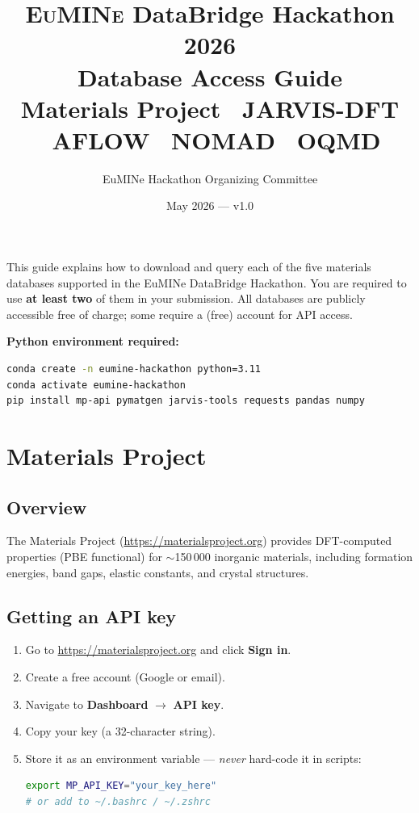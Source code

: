 \documentclass[11pt,a4paper]{article}
\title{%
  {\large \textcolor{eumine_blue}{\textsc{EuMINe} DataBridge Hackathon 2026}}\\[6pt]
  \textbf{Database Access Guide}\\[4pt]
  {\normalsize Materials Project \textbullet\ JARVIS-DFT \textbullet\ AFLOW
   \textbullet\ NOMAD \textbullet\ OQMD}
}
\author{EuMINe Hackathon Organizing Committee}
\date{May 2026 --- v1.0}
\begin{document}
\maketitle
\thispagestyle{fancy}
\tableofcontents
\vspace{1em}

\noindent
This guide explains how to download and query each of the five materials databases
supported in the EuMINe DataBridge Hackathon.
You are required to use \textbf{at least two} of them in your submission.
All databases are publicly accessible free of charge; some require a (free) account
for API access.

\medskip
\noindent\textbf{Python environment required:}
\begin{lstlisting}[language=bash]
conda create -n eumine-hackathon python=3.11
conda activate eumine-hackathon
pip install mp-api pymatgen jarvis-tools requests pandas numpy
\end{lstlisting}

\section{Materials Project}

\subsection{Overview}
The Materials Project (\url{https://materialsproject.org}) provides DFT-computed
properties (PBE functional) for $\sim$150\,000 inorganic materials, including
formation energies, band gaps, elastic constants, and crystal structures.

\subsection{Getting an API key}
\begin{enumerate}
  \item Go to \url{https://materialsproject.org} and click \textbf{Sign in}.
  \item Create a free account (Google or email).
  \item Navigate to \textbf{Dashboard} $\to$ \textbf{API key}.
  \item Copy your key (a 32-character string).
  \item Store it as an environment variable --- \emph{never} hard-code it in scripts:
\begin{lstlisting}[language=bash]
export MP_API_KEY="your_key_here"
# or add to ~/.bashrc / ~/.zshrc
\end{lstlisting}
\end{enumerate}
\end{document}
